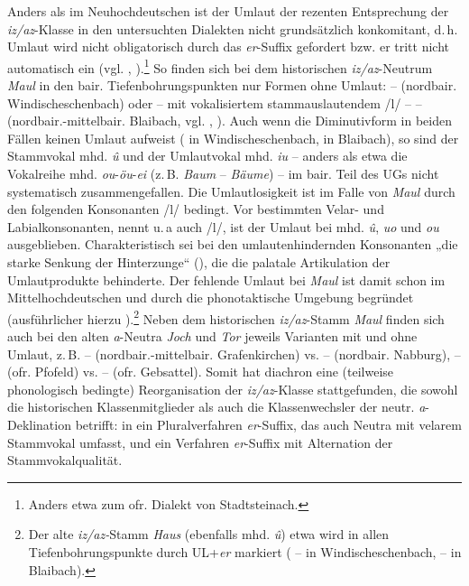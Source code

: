 Anders als im Neuhochdeutschen ist der Umlaut der rezenten Entsprechung der \textit{iz/az}{}-Klasse in den untersuchten Dialekten nicht grundsätzlich konkomitant, d.\,h. Umlaut wird nicht obligatorisch durch das \textit{er}{}-Suffix gefordert bzw. er tritt nicht automatisch ein (vgl. \citealt[82]{Dammel2018}, \citealt[163]{Rowley1997}).\footnote{Anders etwa \citet[§21]{Schübel1955} zum ofr. Dialekt von Stadtsteinach.} So finden sich bei dem his\-to\-ri\-schen \textit{iz/az}{}-Neutrum \textit{Maul} in den bair. Tiefenbohrungspunkten nur Formen ohne Umlaut:  --  (nordbair. Win\-disch\-eschen\-bach) oder -- mit vokalisiertem stammauslautendem /l/ --  --  (nordbair.-mittelbair. Blaibach, vgl. \citealt[Karte 32]{SBS9.1}, \citealt[Karten 20, 38]{SMF2.1}). Auch wenn die Diminutivform in beiden Fällen keinen Umlaut aufweist ( in Windischeschenbach,  in Blaibach), so sind der Stammvokal mhd. \textit{û} und der Umlautvokal mhd. \textit{iu} -- anders als etwa die Vokalreihe mhd. \textit{ou}{}-\textit{öu}{}-\textit{ei} (z.\,B. \textit{Baum} -- \textit{Bäume}) -- im bair. Teil des UGs nicht systematisch zusammengefallen. Die Umlautlosigkeit ist im Falle von \textit{Maul} durch den folgenden Konsonanten /l/ bedingt. Vor bestimmten Velar- und Labialkonsonanten, \citet[9b, 49c]{Kranzmayer1956} nennt u.\,a auch /l/, ist der Umlaut bei mhd. \textit{û}, \textit{uo} und \textit{ou} ausgeblieben. Charakteristisch sei bei den umlautenhindernden Konsonanten „die starke Senkung der Hinterzunge“ (\citealt[49e]{Kranzmayer1956}), die die palatale Artikulation der Umlautprodukte behinderte. Der fehlende Umlaut bei \textit{Maul} ist damit schon im Mittelhochdeutschen und durch die phonotaktische Umgebung begründet (ausführlicher hierzu ).\footnote{Der alte \textit{iz/az-}Stamm \textit{Haus} (ebenfalls mhd. \textit{û}) etwa wird in allen Tiefenbohrungspunkte durch UL+\textit{er} markiert ( --  in Windischeschenbach,   --  in Blaibach).} Neben dem historischen \textit{iz/az}{}-Stamm \textit{Maul} finden sich auch bei den alten \textit{a}{}-Neutra \textit{Joch} und \textit{Tor} jeweils Varianten mit und ohne Umlaut, z.\,B.  --  (nordbair.-mittelbair. Grafenkirchen) vs.  --  (nordbair. Nabburg),  --  (ofr. Pfofeld) vs.  --  (ofr. Gebsattel). Somit hat diachron eine (teilweise phonologisch bedingte) Reorganisation der \textit{iz/az}{}-Klasse stattgefunden, die sowohl die historischen Klassenmitglieder als auch die Klassenwechsler der neutr. \textit{a}{}-Deklination betrifft: in ein Pluralverfahren \textit{er}{}-Suffix, das auch Neutra mit velarem Stammvokal umfasst, und ein Verfahren \textit{er}{}-Suffix mit Alternation der Stammvokalqualität.


